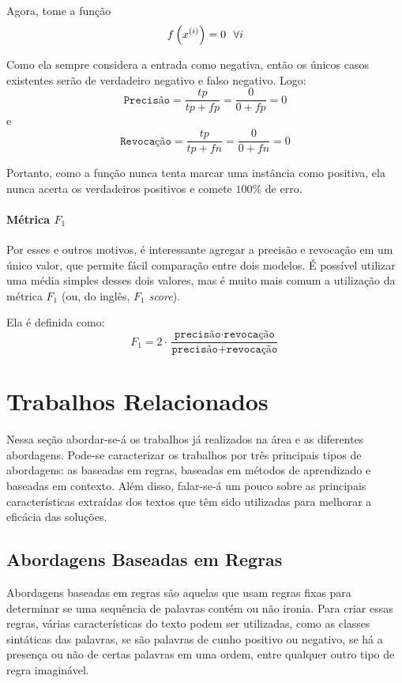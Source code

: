 Agora, tome a função
\begin{equation}
  f\paren{\xii[x]{i}} = 0~~\forall i
\end{equation}

Como ela sempre considera a entrada como negativa, então os únicos casos
existentes serão de verdadeiro negativo e falso negativo. Logo:
\[
\texttt{Precisão} = \dfrac{tp}{tp+fp} = \dfrac{0}{0+fp} = 0
\]
e
\[
\texttt{Revocação} = \dfrac{tp}{tp+fn} = \dfrac{0}{0+fn} = 0
\]

Portanto, como a função nunca tenta marcar uma instância como positiva, ela
nunca acerta os verdadeiros positivos e comete $100\%$ de erro.

\paragraph{Métrica $F_1$}%
\label{par:metrica_f_1_}

Por esses e outros motivos, é interessante agregar a precisão e revocação em um
único valor, que permite fácil comparação entre dois modelos. É possível
utilizar uma média simples desses dois valores, mas é muito mais comum a
utilização da métrica $F_1$ (ou, do inglês, $F_1$ \textit{score}).

Ela é definida como:
\[
F_1=2\cdot
\dfrac{\texttt{precisão}\cdot\texttt{revocação}}
{\texttt{precisão}+\texttt{revocação}}
\]

\section{Trabalhos Relacionados}%
\label{sec:trabalhos_relacionados}

Nessa seção abordar-se-á os trabalhos já realizados na área e as diferentes
abordagens. Pode-se caracterizar os trabalhos por três principais tipos de
abordagens: as baseadas em regras, baseadas em métodos de aprendizado e baseadas
em contexto. Além disso, falar-se-á um pouco sobre as principais características
extraídas dos textos que têm sido utilizadas para melhorar a eficácia das
soluções.

\subsection{Abordagens Baseadas em Regras}%
\label{sub:abordagens_baseados_em_regras}

Abordagens baseadas em regras são aquelas que usam regras fixas para determinar
se uma sequência de palavras contém ou não ironia. Para criar essas regras,
várias características do texto podem ser utilizadas, como as classes sintáticas
das palavras, se são palavras de cunho positivo ou negativo, se há a presença ou
não de certas palavras em uma ordem, entre qualquer outro tipo de regra
imaginável.

